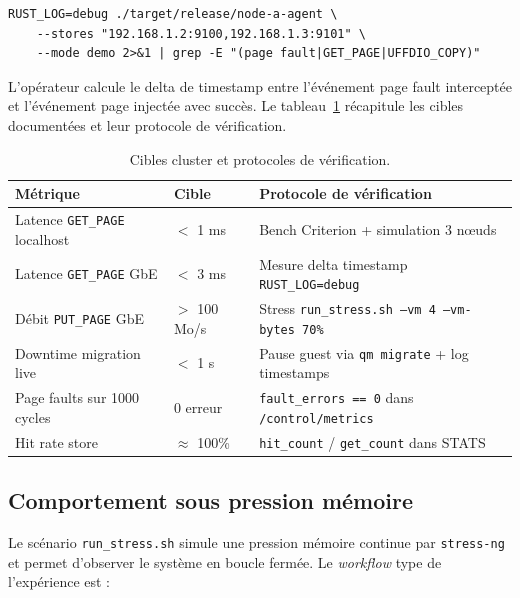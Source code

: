 \begin{lstlisting}[basicstyle=\ttfamily\footnotesize, frame=single]
RUST_LOG=debug ./target/release/node-a-agent \
    --stores "192.168.1.2:9100,192.168.1.3:9101" \
    --mode demo 2>&1 | grep -E "(page fault|GET_PAGE|UFFDIO_COPY)"
\end{lstlisting}

L'opérateur calcule le delta de timestamp entre l'événement \og{}page fault interceptée\fg{} et l'événement \og{}page injectée avec succès\fg{}. Le tableau~\ref{tab:cibles-cluster} récapitule les cibles documentées et leur protocole de vérification.

\begin{table}[H]
\centering
\small
\caption{Cibles cluster et protocoles de vérification.}
\begin{tabular}{p{4cm}p{2.5cm}p{6.5cm}}
\toprule
\textbf{Métrique} & \textbf{Cible} & \textbf{Protocole de vérification} \\
\midrule
Latence \texttt{GET\_PAGE} localhost & $<$ 1 ms     & Bench Criterion + simulation 3 nœuds \\
Latence \texttt{GET\_PAGE} GbE       & $<$ 3 ms     & Mesure delta timestamp \texttt{RUST\_LOG=debug} \\
Débit \texttt{PUT\_PAGE} GbE         & $>$ 100 Mo/s & Stress \texttt{run\_stress.sh --vm 4 --vm-bytes 70\%} \\
Downtime migration live              & $<$ 1 s      & Pause guest via \texttt{qm migrate} + log timestamps \\
Page faults sur 1000 cycles          & 0 erreur     & \texttt{fault\_errors == 0} dans \texttt{/control/metrics} \\
Hit rate store                       & $\approx$ 100\% & \texttt{hit\_count} / \texttt{get\_count} dans STATS \\
\bottomrule
\end{tabular}

\label{tab:cibles-cluster}
\end{table}

\subsection{Comportement sous pression mémoire}

Le scénario \texttt{run\_stress.sh} simule une pression mémoire continue par \texttt{stress-ng} et permet d'observer le système en boucle fermée. Le \emph{workflow} type de l'expérience est :


